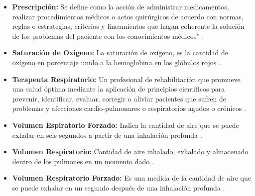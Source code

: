 \documentclass[12pt]{article}
\begin{document}
\begin{itemize}
\item \textbf{Prescripción:} Se define como la acción de administrar medicamentos, realizar procedimientos médicos o actos quirúrgicos de acuerdo con normas, reglas o estrategias, criterios y lineamientos que hagan coherente la solución de los problemas del paciente con los conocimientos médicos” \cite{20}.


\item \textbf{Saturación de Oxigeno:} La saturación de oxígeno, es la cantidad de oxígeno en porcentaje unido a la hemoglobina en los glóbulos rojos \cite{3}.

\item \textbf{Terapeuta Respiratorio:} Un profesional de rehabilitación que promueve una salud óptima mediante la aplicación de principios científicos para prevenir, identificar, evaluar, corregir o aliviar pacientes que sufren de problemas y afecciones cardio-pulmonares o respiratorios agudos o crónicos \cite{4}.

\item \textbf{Volumen Espiratorio Forzado:} Indica la cantidad de aire que se puede exhalar en seis segundos a partir de una inhalación profunda \cite{22}.

\item \textbf{Volumen Respiratorio:} Cantidad de aire inhalado, exhalado y almacenado dentro de los pulmones en un momento dado \cite{2}.

\item \textbf{Volumen Respiratorio Forzado:} Es una medida de la cantidad de aire que se puede exhalar en un segundo después de una inhalación profunda \cite{22}.











\end{itemize}
\newpage
\end{document}
